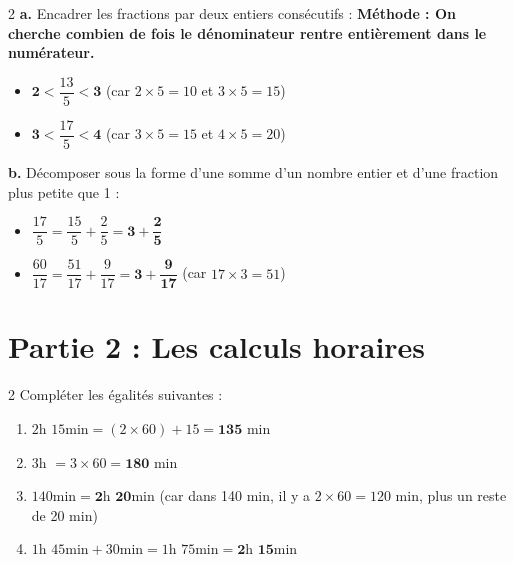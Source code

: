 \documentclass[a4paper]{book}
\begin{document}
{    
    \begin{exerciceNote}{2}    
        \textbf{a.} Encadrer les fractions par deux entiers consécutifs : \newline
        \textbf{Méthode : On cherche combien de fois le dénominateur rentre entièrement dans le numérateur.}
        \begin{itemize}
            \item[] $\mathbf{2} < \dfrac{13}{5} < \mathbf{3}$ \quad (car $2 \times 5 = 10$ et $3 \times 5 = 15$)
            \item[] $\mathbf{3} < \dfrac{17}{5} < \mathbf{4}$ \quad (car $3 \times 5 = 15$ et $4 \times 5 = 20$)
        \end{itemize}
        
        \textbf{b.} Décomposer sous la forme d'une somme d'un nombre entier et d'une fraction plus petite que 1 : \newline
        \begin{itemize}
            \item[] $\dfrac{17}{5} = \dfrac{15}{5} + \dfrac{2}{5} = \mathbf{3 + \dfrac{2}{5}}$
            \item[] $\dfrac{60}{17} = \dfrac{51}{17} + \dfrac{9}{17} = \mathbf{3 + \dfrac{9}{17}}$ \quad (car $17 \times 3 = 51$)
        \end{itemize}
    \end{exerciceNote}
    
    
\section*{Partie 2 : Les calculs horaires}

        
    \begin{exerciceNote}{2}
        Compléter les égalités suivantes :
        \begin{enumerate}
            \item $2\text{h } 15\text{min} = (2 \times 60) + 15 = \mathbf{135} \text{ min}$
            \item $3\text{h } = 3 \times 60 = \mathbf{180} \text{ min}$
            \item $140\text{min} = \mathbf{2}\text{h } \mathbf{20}\text{min}$ \quad (car dans 140 min, il y a $2 \times 60 = 120$ min, plus un reste de 20 min)
            \item $1\text{h } 45\text{min} + 30\text{min} = 1\text{h } 75\text{min} = \mathbf{2}\text{h } \mathbf{15}\text{min}$
        \end{enumerate}
    \end{exerciceNote}
    
}
\end{document}
